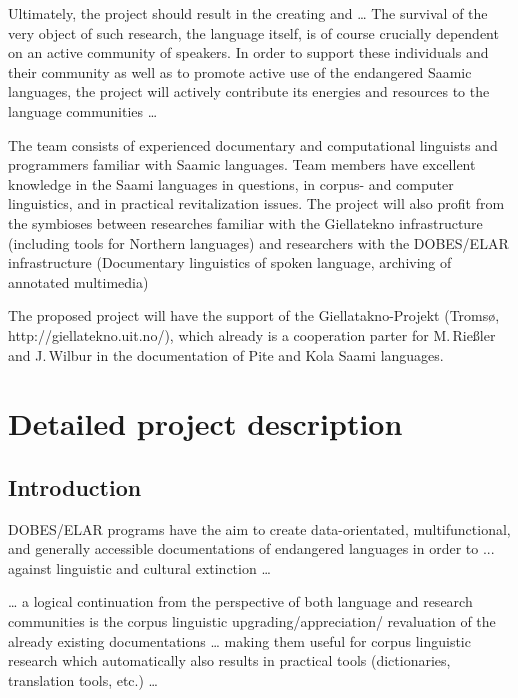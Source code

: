 \documentclass[a4paper,12pt]{article}
\begin{document}
Ultimately, the project should result in the creating and … The survival of the very object of such research, the language itself, is of course crucially dependent on an active community of speakers. In order to support these individuals and their community as well as to promote active use of the endangered Saamic languages, the project will actively contribute its energies and resources to the language communities …

The team consists of experienced documentary and computational linguists and programmers familiar with Saamic languages. Team members have excellent knowledge in the Saami languages in questions, in corpus- and computer linguistics, and in practical revitalization issues. The project will also profit from the symbioses between researches familiar with the Giellatekno infrastructure (including tools for Northern languages) and researchers with the DOBES/ELAR infrastructure (Documentary linguistics of spoken language, archiving of annotated multimedia)

The proposed project will have the support of the {Giellatakno-Projekt} (Tromsø, http://giellatekno.uit.no/), which already is a cooperation parter for M.\,Rießler and J.\,Wilbur in the documentation of Pite and Kola Saami languages. 

\section{Detailed project description}%
\subsection{Introduction}

DOBES/ELAR programs have the aim to create data-orientated, multifunctional, and generally accessible documentations of endangered languages in order to ... against linguistic and cultural extinction … 
 
… a logical continuation from the perspective of both language and research communities is the corpus linguistic upgrading/appreciation/
revaluation of the already existing documentations … making them useful for corpus linguistic research which automatically also results in practical tools (dictionaries, translation tools, etc.) …
\end{document}

